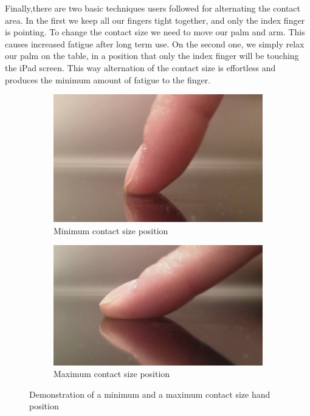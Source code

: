 Finally,there are two basic techniques users followed for alternating the contact area. In the first we keep all our fingers tight together, and only the index finger is pointing. To change the contact size we need to move our palm and arm. This causes increased fatigue after long term use. On the second one, we simply relax our palm on the table, in a position that only the index finger will be touching the iPad screen. This way alternation of the contact size is effortless and produces the minimum amount of fatigue to the finger.




\begin{figure}[H]
\centering
\begin{subfigure}[b]{0.4\textwidth}
	\centering
	\includegraphics[width=\textwidth]{figures/ffmin}
	\caption{Minimum contact size position}
	\label{fig:ffmin}
\end{subfigure}
\hfill
\begin{subfigure}[b]{0.4\textwidth}
	\centering
	\includegraphics[width=\textwidth]{figures/ffmax}
	\caption{Maximum contact size position}
	\label{fig:ffmax}
\end{subfigure}
\caption{Demonstration of a minimum and a maximum contact size hand position}
\label{fig:ffMinMax}
\end{figure}

